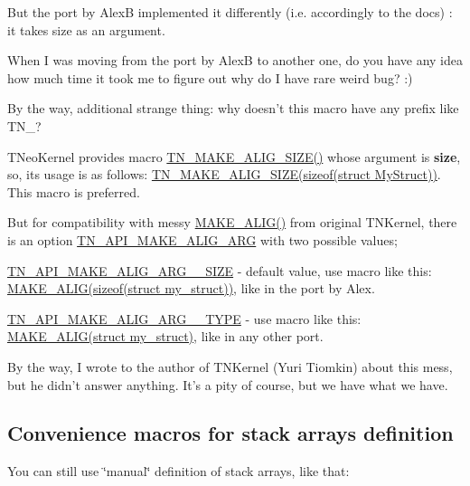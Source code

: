 But the port by Alex\+B implemented it differently (i.\+e. accordingly to the docs) \+: it takes size as an argument.

When I was moving from the port by Alex\+B to another one, do you have any idea how much time it took me to figure out why do I have rare weird bug? \+:)

By the way, additional strange thing\+: why doesn't this macro have any prefix like {\ttfamily T\+N\+\_\+}?

T\+Neo\+Kernel provides macro {\ttfamily \hyperlink{tn__common_8h_a3f48380e8a624edc643319a81192d88e}{T\+N\+\_\+\+M\+A\+K\+E\+\_\+\+A\+L\+I\+G\+\_\+\+S\+I\+Z\+E()}} whose argument is {\bfseries size}, so, its usage is as follows\+: {\ttfamily \hyperlink{tn__common_8h_a3f48380e8a624edc643319a81192d88e}{T\+N\+\_\+\+M\+A\+K\+E\+\_\+\+A\+L\+I\+G\+\_\+\+S\+I\+Z\+E(sizeof(struct My\+Struct))}}. This macro is preferred.

But for compatibility with messy {\ttfamily \hyperlink{tn__oldsymbols_8h_aa42d2e6b5b7ff37bd485803fa2cb70a8}{M\+A\+K\+E\+\_\+\+A\+L\+I\+G()}} from original T\+N\+Kernel, there is an option {\ttfamily \hyperlink{tn__cfg__default_8h_a2a1148efc6a74131cc83ee50cbc386cd}{T\+N\+\_\+\+A\+P\+I\+\_\+\+M\+A\+K\+E\+\_\+\+A\+L\+I\+G\+\_\+\+A\+R\+G}} with two possible values;


\begin{DoxyItemize}
\item {\ttfamily \hyperlink{tn__common_8h_a4972bf0cbc72e51a7463cf7d786d2b64}{T\+N\+\_\+\+A\+P\+I\+\_\+\+M\+A\+K\+E\+\_\+\+A\+L\+I\+G\+\_\+\+A\+R\+G\+\_\+\+\_\+\+S\+I\+Z\+E}} -\/ default value, use macro like this\+: {\ttfamily \hyperlink{tn__oldsymbols_8h_aa42d2e6b5b7ff37bd485803fa2cb70a8}{M\+A\+K\+E\+\_\+\+A\+L\+I\+G(sizeof(struct my\+\_\+struct))}}, like in the port by Alex.
\item {\ttfamily \hyperlink{tn__common_8h_a04321413cf21754a05682b298df0493d}{T\+N\+\_\+\+A\+P\+I\+\_\+\+M\+A\+K\+E\+\_\+\+A\+L\+I\+G\+\_\+\+A\+R\+G\+\_\+\+\_\+\+T\+Y\+P\+E}} -\/ use macro like this\+: {\ttfamily \hyperlink{tn__oldsymbols_8h_aa42d2e6b5b7ff37bd485803fa2cb70a8}{M\+A\+K\+E\+\_\+\+A\+L\+I\+G(struct my\+\_\+struct)}}, like in any other port.
\end{DoxyItemize}

By the way, I wrote to the author of T\+N\+Kernel (Yuri Tiomkin) about this mess, but he didn't answer anything. It's a pity of course, but we have what we have.\hypertarget{tnkernel_diff_tnkernel_new_api__convenience_macros_stack}{}\subsection{Convenience macros for stack arrays definition}\label{tnkernel_diff_tnkernel_new_api__convenience_macros_stack}
You can still use \char`\"{}manual\char`\"{} definition of stack arrays, like that\+:


